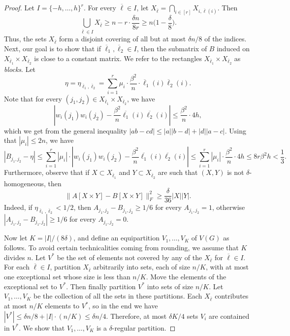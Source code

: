 \documentclass[11pt]{article}
\theoremstyle{plain}
\theoremstyle{definition}
\begin{document}
\begin{proof}
Let $I=\{-h,\dots,h\}^r$. For every $\overline{\ell}\in I$, let $X_{\overline{\ell}}=\bigcap_{i\in [r]}X_{i,\overline{\ell}(i)}.$ Then 
\begin{equation}\label{equ:sparse_entries}
    \bigcup_{\overline{\ell}\in I}X_{\overline{\ell}}
    \ge n - r \cdot \frac{\delta n}{8r}
    \geq n\Big(1-\frac{\delta}{8}\Big).
\end{equation}
Thus, the sets $X_{\overline{\ell}}$ form a disjoint covering of all but at most $\delta n/8$ of the indices. 
Next, our goal is to show that if $\overline{\ell}_1,\overline{\ell}_2\in I$, then the submatrix of $B$ induced on $X_{\overline{\ell}_1}\times X_{\overline{\ell}_2}$ is close to a constant matrix. 
We refer to the rectangles $X_{\overline{\ell}_1}\times X_{\overline{\ell}_2}$ as \emph{blocks}.  
Let $$\eta=\eta_{\overline{\ell}_1,\overline{\ell}_2}=\sum_{i=1}^r \mu_i\cdot \frac{\beta^2}{n}\cdot\overline{\ell}_1(i)\overline{\ell}_2(i).$$
Note that for every $(j_1,j_2)\in X_{\overline{\ell}_1}\times X_{\overline{\ell}_2}$, we have $$\left|w_i(j_1)w_i(j_2)-\frac{\beta^2}{n}\overline{\ell_1}(i)\overline{\ell_2}(i)\right| \leq \frac{\beta^2}{n}\cdot 4h,$$
which we get from the general inequality $|ab-cd|\leq |a||b-d|+|d||a-c|$. 
Using that $|\mu_i| \le 2n$,  we have
\begin{equation}\nonumber %
    |B_{j_1,j_2}-\eta|\leq \sum_{i=1}^r |\mu_i|\cdot \left|w_i(j_1)w_i(j_2)-\frac{\beta^2}{n}\overline{\ell_1}(i)\overline{\ell_2}(i)\right|\leq \sum_{i=1}^r |\mu_i|\cdot \frac{\beta^2}{n}\cdot 4h\leq 8r\beta^2h <\frac{1}{3}.
\end{equation}
Furthermore, observe that if $X\subset X_{\overline{\ell}_1}$ and $Y\subset X_{\overline{\ell}_2}$ are such that $(X,Y)$ is not $\delta$-homogeneous, then $$\big\|A[X\times Y]-B[X\times Y]\big\|_F^2\geq \frac{\delta}{36}|X|| Y|.$$
Indeed, if $\eta_{\overline{\ell}_1,\overline{\ell}_2}<1/2$, then $A_{j_1,j_2}-B_{j_1,j_2}\geq 1/6$ for every $A_{j_1,j_2}=1$, otherwise $|A_{j_1,j_2}-B_{j_1,j_2}|\geq 1/6$ for every $A_{j_1,j_2}=0$.

Now let $K=|I|/(8\delta)$, and define an  equipartition $V_1,\dots,V_K$  of $V(G)$ as follows. To avoid certain technicalities coming from rounding, we assume that $K$ divides $n$. Let $V^*$ be the set of elements not covered by any of the $X_{\overline{\ell}}$ for $\overline{\ell}\in I$. 
For each $\overline{\ell}\in I$, partition $X_{\overline{\ell}}$ arbitrarily into sets, each of size $n/K$, with at most one exceptional set whose size is less than $n/K$.  Move the elements of the exceptional set to $V^*$. Then finally partition $V^*$ into sets of size $n/K$. Let $V_1,\dots,V_K$ be the collection of all the sets in these partitions. Each $X_{\overline{\ell}}$ contributes at most $n/K$ elements to $V^*$, so in the end we have $|V^*|\leq \delta n/8+|I|\cdot (n/K)\leq \delta n/4$. 
Therefore, at most $\delta K/4$ sets $V_i$ are contained in $V^*$.  We show that $V_1,\dots,V_K$ is a $\delta$-regular partition.  


\end{proof}
\end{document}
